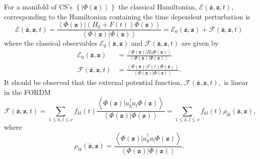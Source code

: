 \documentclass[aps,preprint]{revtex4}%
\begin{document}
For a manifold of CS's $\left\{  \left\vert \Phi\left(  \mathbf{z}\right)
\right\rangle \right\}  $ the classical Hamiltonian, $\mathcal{E}\left(
\mathbf{\bar{z}},\mathbf{z,}t\right)  $, corresponding to the Hamiltonian
containing the time dependent perturbation is
\begin{equation}
\mathcal{E}\left(  \mathbf{\bar{z}},\mathbf{z,}t\right)  =\frac{\left\langle
\left.  \Phi\left(  \mathbf{z}\right)  \right\vert \left(  H_{0}+F\left(
t\right)  \right)  \Phi\left(  \mathbf{z}\right)  \right\rangle }{\left\langle
\left.  \Phi\left(  \mathbf{z}\right)  \right\vert \Phi\left(  \mathbf{z}%
\right)  \right\rangle }=\mathcal{E}_{0}\left(  \mathbf{\bar{z}}%
,\mathbf{z}\right)  +\mathcal{F}\left(  \mathbf{\bar{z}},\mathbf{z,}t\right)
\end{equation}
where the classical observables $\mathcal{E}_{0}\left(  \mathbf{\bar{z}%
},\mathbf{z}\right)  $ and $\mathcal{F}\left(  \mathbf{\bar{z}},\mathbf{z,}%
t\right)  $ are given by
\begin{align}
\mathcal{E}_{0}\left(  \mathbf{\bar{z}},\mathbf{z}\right)   &  =\frac
{\left\langle \left.  \Phi\left(  \mathbf{z}\right)  \right\vert H_{0}%
\Phi\left(  \mathbf{z}\right)  \right\rangle }{\left\langle \left.
\Phi\left(  \mathbf{z}\right)  \right\vert \Phi\left(  \mathbf{z}\right)
\right\rangle }\nonumber\\
\mathcal{F}\left(  \mathbf{\bar{z}},\mathbf{z,}t\right)   &  =\frac
{\left\langle \left.  \Phi\left(  \mathbf{z}\right)  \right\vert F\left(
t\right)  \Phi\left(  \mathbf{z}\right)  \right\rangle }{\left\langle \left.
\Phi\left(  \mathbf{z}\right)  \right\vert \Phi\left(  \mathbf{z}\right)
\right\rangle }.
\end{align}
It should be observed that the external potential function, $\mathcal{F}%
\left(  \mathbf{\bar{z}},\mathbf{z,}t\right)  ,$ is linear in the FORDM
\begin{equation}
\mathcal{F}\left(  \mathbf{\bar{z}},\mathbf{z,}t\right)  =\sum_{1\leq
k,l\leq\nu}f_{kl}\left(  t\right)  \frac{\left\langle \left.  \Phi\left(
\mathbf{z}\right)  \right\vert a_{k}^{\dagger}a_{l}\Phi\left(  \mathbf{z}%
\right)  \right\rangle }{\left\langle \left.  \Phi\left(  \mathbf{z}\right)
\right\vert \Phi\left(  \mathbf{z}\right)  \right\rangle }=\sum_{1\leq
k,l\leq\nu}f_{kl}\left(  t\right)  \rho_{lk}\left(  \mathbf{\bar{z}%
},\mathbf{z}\right)  , \label{expot}%
\end{equation}
where
\begin{equation}
\rho_{lk}\left(  \mathbf{\bar{z}},\mathbf{z}\right)  =\frac{\left\langle
\left.  \Phi\left(  \mathbf{z}\right)  \right\vert a_{k}^{\dagger}a_{l}%
\Phi\left(  \mathbf{z}\right)  \right\rangle }{\left\langle \left.
\Phi\left(  \mathbf{z}\right)  \right\vert \Phi\left(  \mathbf{z}\right)
\right\rangle }.
\end{equation}
\end{document}
